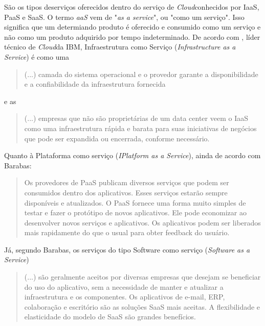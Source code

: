 \documentclass[a4paper]{article}
\newcommand{\C}{\emph{Cloud}}
\begin{document}
São os tipos deserviços oferecidos dentro do serviço de \C conhecidos por IaaS, PaaS e SaaS. O termo \emph{aaS} vem de "\emph{as a service}", ou "como um serviço". Isso significa que um determiando produto é oferecido e consumido como um serviço e não como um produto adquirido por tempo indeterminado. De acordo com , líder técnico de \C da IBM, Infraestrutura como Serviço (\emph{Infrastructure as a Service}) é como uma 
\begin{quotation}
(...) camada do sistema operacional e o provedor garante a disponibilidade e a confiabilidade da infraestrutura fornecida
\end{quotation}
e as
\begin{quotation}
(...) empresas que não são proprietárias de um data center veem o IaaS como uma infraestrutura rápida e barata para suas iniciativas de negócios que pode ser expandida ou encerrada, conforme necessário.
\end{quotation}
Quanto à Plataforma como serviço (\emph{IPlatform as a Service}), ainda de acordo com Barabas:
\begin{quotation}
Os provedores de PaaS publicam diversos serviços que podem ser consumidos dentro dos aplicativos. Esses serviços estarão sempre disponíveis e atualizados. O PaaS fornece uma forma muito simples de testar e fazer o protótipo de novos aplicativos. Ele pode economizar ao desenvolver novos serviços e aplicativos. Os aplicativos podem ser liberados mais rapidamente do que o usual para obter feedback do usuário.
\end{quotation}
Já, segundo Barabas, os serviços do tipo Software como serviço (\emph{Software as a Service}) 
\begin{quotation}
(...) são geralmente aceitos por diversas empresas que desejam se beneficiar do uso do aplicativo, sem a necessidade de manter e atualizar a infraestrutura e os componentes. Os aplicativos de e-mail, ERP, colaboração e escritório são as soluções SaaS mais aceitas. A flexibilidade e elasticidade do modelo de SaaS são grandes benefícios.
\end{quotation}
\end{document}

